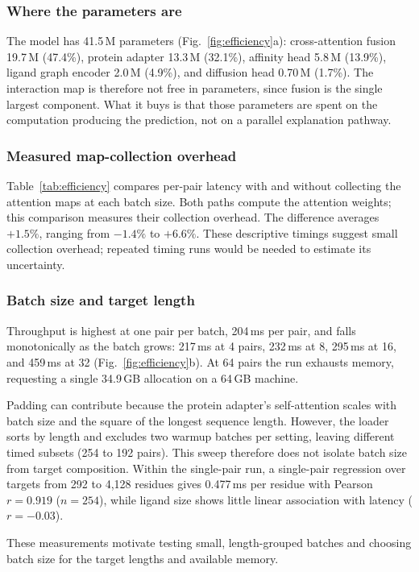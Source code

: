 \documentclass{ieeeaccess}
\begin{document}
\subsubsection{Where the parameters are}
The model has 41.5\,M parameters (Fig.~\ref{fig:efficiency}a): cross-attention
fusion 19.7\,M (47.4\%), protein adapter 13.3\,M (32.1\%), affinity head 5.8\,M
(13.9\%), ligand graph encoder 2.0\,M (4.9\%), and diffusion head 0.70\,M (1.7\%).
The interaction map is therefore not free in parameters, since fusion is the
single largest component. What it buys is that those parameters are spent on the
computation producing the prediction, not on a parallel explanation pathway.

\subsubsection{Measured map-collection overhead}
Table~\ref{tab:efficiency} compares per-pair latency with and without
collecting the attention maps at each batch size. Both paths compute the
attention weights; this comparison measures their collection overhead. The difference averages
$+1.5\%$, ranging from $-1.4\%$ to $+6.6\%$. These descriptive timings suggest
small collection overhead; repeated timing runs would be needed to estimate
its uncertainty.

\subsubsection{Batch size and target length}
Throughput is highest at one pair per batch, 204\,ms per pair, and falls
monotonically as the batch grows: 217\,ms at 4 pairs, 232\,ms at 8, 295\,ms at 16,
and 459\,ms at 32 (Fig.~\ref{fig:efficiency}b). At 64 pairs the run exhausts
memory, requesting a single 34.9\,GB allocation on a 64\,GB machine.

Padding can contribute because the protein adapter's self-attention scales
with batch size and the square of the longest sequence length. However, the
loader sorts by length and excludes two warmup batches per setting, leaving
different timed subsets (254 to 192 pairs). This sweep therefore does not
isolate batch size from target composition. Within the single-pair run, a
single-pair regression over targets from 292 to 4{,}128 residues gives 0.477\,ms
per residue with Pearson $r = 0.919$ ($n = 254$), while ligand size shows
little linear association with latency ($r = -0.03$).

These measurements motivate testing small, length-grouped batches and
choosing batch size for the target lengths and available memory.
\end{document}
